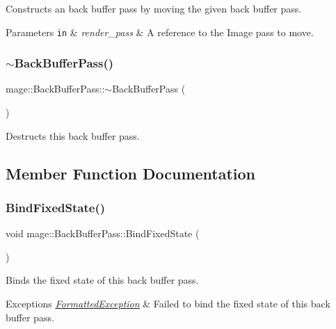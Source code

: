 Constructs an back buffer pass by moving the given back buffer pass.


\begin{DoxyParams}[1]{Parameters}
\mbox{\tt in}  & {\em render\+\_\+pass} & A reference to the Image pass to move. \\
\hline
\end{DoxyParams}
\hypertarget{classmage_1_1_back_buffer_pass_a10ccd92ff4480261e9ecfc435f5d9ed3}{}\label{classmage_1_1_back_buffer_pass_a10ccd92ff4480261e9ecfc435f5d9ed3} 
\subsubsection{\texorpdfstring{$\sim$\+Back\+Buffer\+Pass()}{~BackBufferPass()}}
{\footnotesize\ttfamily mage\+::\+Back\+Buffer\+Pass\+::$\sim$\+Back\+Buffer\+Pass (\begin{DoxyParamCaption}{ }\end{DoxyParamCaption})\hspace{0.3cm}{\ttfamily [default]}}

Destructs this back buffer pass. 

\subsection{Member Function Documentation}
\hypertarget{classmage_1_1_back_buffer_pass_a86dd8df1ac3fac070d1373dad045c975}{}\label{classmage_1_1_back_buffer_pass_a86dd8df1ac3fac070d1373dad045c975} 
\subsubsection{\texorpdfstring{Bind\+Fixed\+State()}{BindFixedState()}}
{\footnotesize\ttfamily void mage\+::\+Back\+Buffer\+Pass\+::\+Bind\+Fixed\+State (\begin{DoxyParamCaption}{ }\end{DoxyParamCaption})}

Binds the fixed state of this back buffer pass.


\begin{DoxyExceptions}{Exceptions}
{\em \hyperlink{classmage_1_1_formatted_exception}{Formatted\+Exception}} & Failed to bind the fixed state of this back buffer pass. \\
\hline
\end{DoxyExceptions}
\hypertarget{classmage_1_1_back_buffer_pass_ae925b441c80f2aa711fbba6d782e5f81}{}\label{classmage_1_1_back_buffer_pass_ae925b441c80f2aa711fbba6d782e5f81} 
